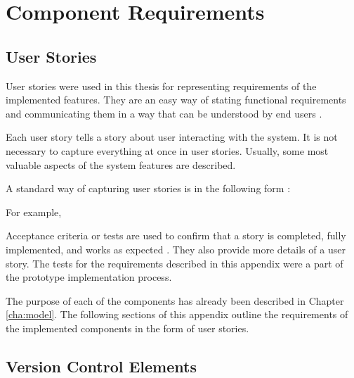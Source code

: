 \chapter{Component Requirements \label{app:specification}}

\section{User Stories}

User stories were used in this thesis for representing requirements of the
implemented features. They are an easy way of stating functional requirements
and communicating them in a way that can be understood by end users
\citep{Crispin2003}.

Each user story tells a story about user interacting with the system. It is not
necessary to capture everything at once in user stories. Usually, some most
valuable aspects of the system features are described.

A standard way of capturing user stories is in the following form
\citep{Cohn2004,Coplien2010}:


For example,


Acceptance criteria or tests are used to confirm that a story is completed,
fully implemented, and works as expected \citep{Cohn2004}. They also provide
more details of a user story. The tests for the requirements described in this
appendix were a part of the prototype implementation process.

The purpose of each of the components has already been described in Chapter
\ref{cha:model}. The following sections of this appendix outline the
requirements of the implemented components in the form of user stories.

\section{Version Control Elements}

